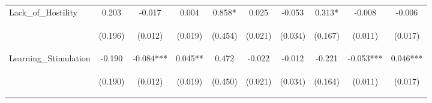 \begin{tabular}{lccccccccc}
\noalign{\smallskip}Lack_of_Hostility & 0.203 & -0.017 & 0.004 & 0.858* & 0.025 & -0.053 & 0.313* & -0.008 & -0.006\\
 & \begin{footnotesize}(0.196)\end{footnotesize} & \begin{footnotesize}(0.012)\end{footnotesize} & \begin{footnotesize}(0.019)\end{footnotesize} & \begin{footnotesize}(0.454)\end{footnotesize} & \begin{footnotesize}(0.021)\end{footnotesize} & \begin{footnotesize}(0.034)\end{footnotesize} & \begin{footnotesize}(0.167)\end{footnotesize} & \begin{footnotesize}(0.011)\end{footnotesize} & \begin{footnotesize}(0.017)\end{footnotesize}\\
\noalign{\smallskip}Learning_Stimulation & -0.190 & -0.084*** & 0.045** & 0.472 & -0.022 & -0.012 & -0.221 & -0.053*** & 0.046***\\
 & \begin{footnotesize}(0.190)\end{footnotesize} & \begin{footnotesize}(0.012)\end{footnotesize} & \begin{footnotesize}(0.019)\end{footnotesize} & \begin{footnotesize}(0.450)\end{footnotesize} & \begin{footnotesize}(0.021)\end{footnotesize} & \begin{footnotesize}(0.034)\end{footnotesize} & \begin{footnotesize}(0.164)\end{footnotesize} & \begin{footnotesize}(0.011)\end{footnotesize} & \begin{footnotesize}(0.017)\end{footnotesize}\\

\end{tabular}
